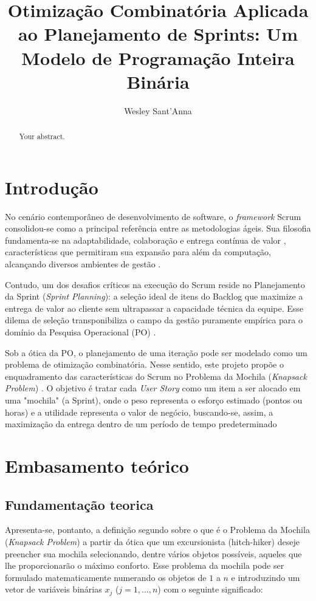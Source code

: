 \documentclass[12pt]{article}
\title{Otimização Combinatória Aplicada ao Planejamento de Sprints: Um Modelo de Programação Inteira Binária}
\author{Wesley Sant'Anna}
\begin{document}
\maketitle

\begin{abstract}
Your abstract.
\end{abstract}

\section{Introdução}

No cenário contemporâneo de desenvolvimento de software, o \textit{framework} Scrum consolidou-se como a principal referência entre as metodologias ágeis. Sua filosofia fundamenta-se na adaptabilidade, colaboração e entrega contínua de valor \cite{10.1145/3779657.3779668}, características que permitiram sua expansão para além da computação, alcançando diversos ambientes de gestão \cite{gheorghe2020agile}.

Contudo, um dos desafios críticos na execução do Scrum reside no Planejamento da Sprint (\textit{Sprint Planning}): a seleção ideal de itens do Backlog que maximize a entrega de valor ao cliente sem ultrapassar a capacidade técnica da equipe. Esse dilema de seleção transponibiliza o campo da gestão puramente empírica para o domínio da Pesquisa Operacional (PO) \cite{Pinto2019Scrum}.

Sob a ótica da PO, o planejamento de uma iteração pode ser modelado como um problema de otimização combinatória. Nesse sentido, este projeto propõe o enquadramento das características do Scrum no Problema da Mochila (\textit{Knapsack Problem}) \cite{martello1990knapsack}. O objetivo é tratar cada \textit{User Story} como um item a ser alocado em uma "mochila" (a Sprint), onde o peso representa o esforço estimado (pontos ou horas) e a utilidade representa o valor de negócio, buscando-se, assim, a maximização da entrega dentro de um período de tempo predeterminado


\section{Embasamento teórico}

\subsection{Fundamentação teorica}
Apresenta-se, pontanto, a definição segundo \cite{martello1990knapsack} sobre o que é o Problema da Mochila (\textit{Knapsack Problem}) a partir da ótica que um excursionista (hitch-hiker) deseje preencher sua mochila selecionando, dentre vários objetos possíveis, aqueles que lhe proporcionarão o máximo conforto. Esse problema da mochila pode ser formulado matematicamente numerando os objetos de $1$ a $n$ e introduzindo um vetor de variáveis binárias $x_j$ ($j = 1, \ldots, n$) com o seguinte significado:
\end{document}
